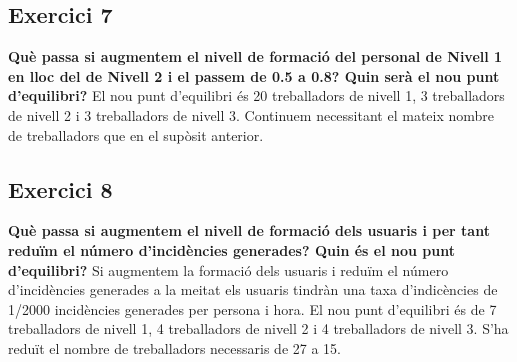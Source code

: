 \documentclass[8pt]{beamer}
\begin{document}
\subsection{Exercici 7}
\begin{frame}
\textbf{Què passa si augmentem el nivell de formació del personal de Nivell 1 en lloc del de Nivell
2 i el passem de 0.5 a 0.8? Quin serà el nou punt d’equilibri?}
\newline
\newline
El nou punt d'equilibri és 20 treballadors de nivell 1, 3 treballadors de nivell 2 i 3 treballadors de nivell 3.
\newline Continuem necessitant el mateix nombre de treballadors que en el supòsit anterior.
\end{frame}

\subsection{Exercici 8}
\begin{frame}
\textbf{Què passa si augmentem el nivell de formació dels usuaris i per tant reduïm el número
d'incidències generades? Quin és el nou punt d'equilibri?}
\newline
\newline
Si augmentem la formació dels usuaris i reduïm el número d'incidències generades a la meitat els usuaris tindràn una taxa d'indicències de 1/2000 incidències generades per persona i hora.
\newline El nou punt d'equilibri és de 7 treballadors de nivell 1, 4 treballadors de nivell 2 i 4 treballadors de nivell 3.
S'ha reduït el nombre de treballadors necessaris de 27 a 15.
\end{frame}
\end{document}
